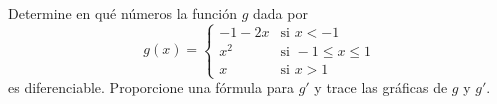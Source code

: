 \item Determine en qué números la función $g$ dada por
$$g(x) = \begin{cases} 
-1 - 2x & \text{si } x < -1 \\ 
x^2 & \text{si } -1 \le x \le 1 \\ 
x & \text{si } x > 1 
\end{cases}$$
es diferenciable. Proporcione una fórmula para $g'$ y trace las gráficas de $g$ y $g'$.
